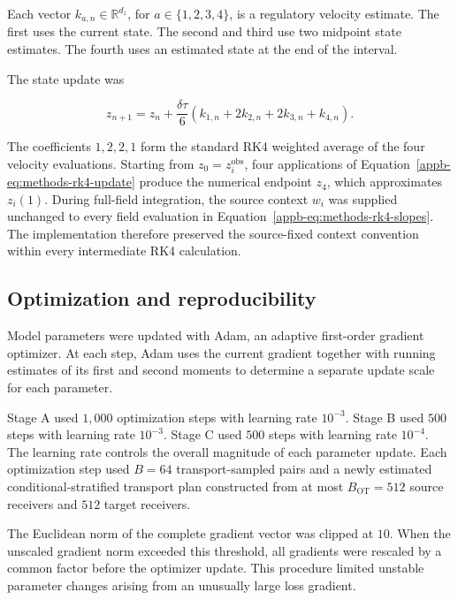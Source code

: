 Each vector
\(k_{a,n}\in\mathbb{R}^{d_z}\), for \(a\in\{1,2,3,4\}\), is a regulatory
velocity estimate. The first uses the current state. The second and third use
two midpoint state estimates. The fourth uses an estimated state at the end of
the interval.

The state update was

\begin{equation}
z_{n+1}
=
z_n
+
\frac{\delta\tau}{6}
\left(
k_{1,n}
+
2k_{2,n}
+
2k_{3,n}
+
k_{4,n}
\right).
\label{appb-eq:methods-rk4-update}
\end{equation}

The coefficients \(1,2,2,1\) form the standard RK4 weighted average of the
four velocity evaluations. Starting from
\(z_0=z_i^{\mathrm{obs}}\), four applications of
Equation~\ref{appb-eq:methods-rk4-update} produce the numerical endpoint
\(z_4\), which approximates \(z_i(1)\). During full-field integration, the
source context \(w_i\) was supplied unchanged to every field evaluation in
Equation~\ref{appb-eq:methods-rk4-slopes}. The implementation therefore preserved the source-fixed context convention within every intermediate RK4 calculation.


\subsection{Optimization and reproducibility}
\label{appb-sec:methods-training-optimization}

Model parameters were updated with Adam, an adaptive first-order gradient
optimizer. At each step, Adam uses the current gradient together with running estimates of its first and second moments to determine a separate update scale for each parameter.

Stage A used \(1{,}000\) optimization steps with learning rate \(10^{-3}\).
Stage B used \(500\) steps with learning rate \(10^{-3}\). Stage C used
\(500\) steps with learning rate \(10^{-4}\). The learning rate controls the
overall magnitude of each parameter update. Each optimization step used
\(B=64\) transport-sampled pairs and a newly estimated
conditional-stratified transport plan constructed from at most
\(B_{\mathrm{OT}}=512\) source receivers and \(512\) target receivers.

The Euclidean norm of the complete gradient vector was clipped at \(10\).
When the unscaled gradient norm exceeded this threshold, all gradients were
rescaled by a common factor before the optimizer update. This procedure
limited unstable parameter changes arising from an unusually large loss
gradient.

